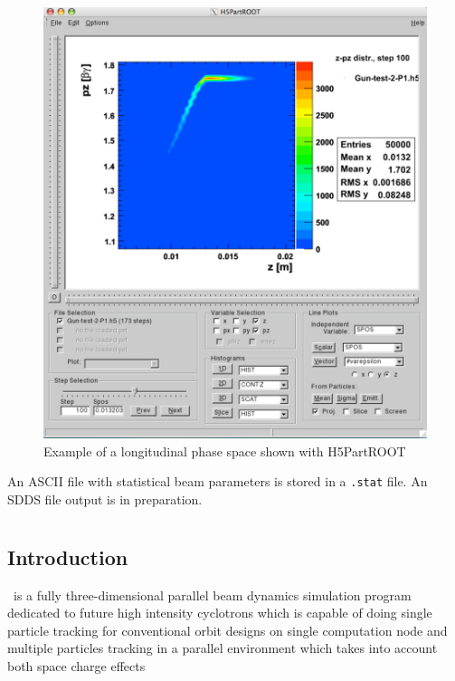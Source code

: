 \begin{figure}[ht]
 \begin{center}
   \includegraphics[width=.9\linewidth,angle=0]{figures/H5rootPicture3}
  \caption{Example of a longitudinal phase space shown with H5PartROOT}
  \label{fig:h5root2}
 \end{center}
\end{figure}



An ASCII file with statistical beam 
parameters is stored in a {\tt .stat} file. An SDDS file output is in preparation.

\section{\opalcycl}
\label{sec:opalcycl}

\subsection{Introduction}

\opalcycl\ is a fully three-dimensional parallel beam dynamics simulation program dedicated to future high intensity cyclotrons 
which is capable of doing single particle tracking for conventional orbit designs on single computation node and 
multiple particles tracking in a parallel environment which takes into account both space charge effects 
 
